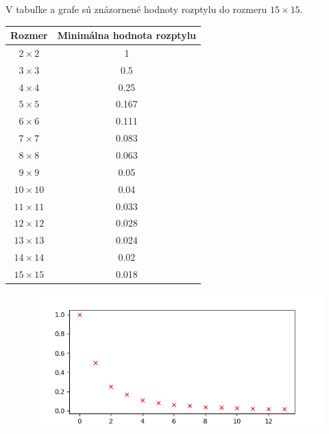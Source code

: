 V tabuľke a grafe sú znázornené hodnoty rozptylu do rozmeru $15 \times 15$.

\begin{center}
\begin{tabular}{ |c|c|}
  \hline
  Rozmer & Minimálna hodnota rozptylu \\ \hline
  $2 \times 2$ & 1 \\ \hline
  $3 \times 3$ & 0.5 \\ \hline
  $4 \times 4$ & 0.25 \\ \hline
  $5 \times 5$ & 0.167 \\ \hline
  $6 \times 6$ & 0.111 \\ \hline
  $7 \times 7$ & 0.083 \\ \hline
  $8 \times 8$ & 0.063 \\ \hline
  $9 \times 9$ & 0.05 \\ \hline
  $10 \times 10$ & 0.04 \\ \hline
  $11 \times 11$ & 0.033 \\ \hline
  $12 \times 12$ & 0.028 \\ \hline
  $13 \times 13$ & 0.024 \\ \hline
  $14 \times 14$ & 0.02 \\ \hline
  $15 \times 15$ & 0.018 \\ \hline
\end{tabular}
\end{center}

\begin{figure}[!h]
  \centering
  \includegraphics{minimalny_rozptyl.png}
\end{figure}
